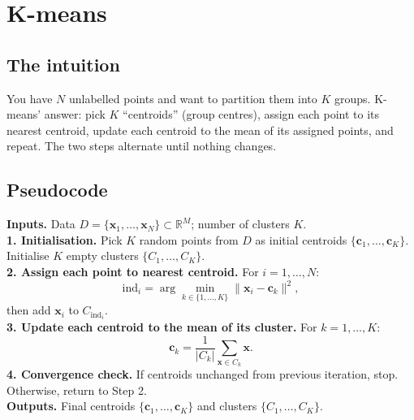 \documentclass[11pt, a4paper]{article}
\begin{document}
\section{K-means}

\subsection{The intuition}

You have $N$ unlabelled points and want to partition them into $K$ groups. K-means' answer: pick $K$ ``centroids'' (group centres), assign each point to its nearest centroid, update each centroid to the mean of its assigned points, and repeat. The two steps alternate until nothing changes.

\subsection{Pseudocode}

\begin{exbox}
\textbf{Inputs.} Data $D = \{\mathbf{x}_1, \ldots, \mathbf{x}_N\} \subset \mathbb{R}^M$; number of clusters $K$.\\[0.3em]
\textbf{1. Initialisation.} Pick $K$ random points from $D$ as initial centroids $\{\mathbf{c}_1, \ldots, \mathbf{c}_K\}$. Initialise $K$ empty clusters $\{C_1, \ldots, C_K\}$.\\[0.2em]
\textbf{2. Assign each point to nearest centroid.} For $i = 1, \ldots, N$:
\[
\mathrm{ind}_i = \arg\min_{k\in\{1,\ldots,K\}}\|\mathbf{x}_i - \mathbf{c}_k\|^2,
\]
\quad then add $\mathbf{x}_i$ to $C_{\mathrm{ind}_i}$.\\[0.2em]
\textbf{3. Update each centroid to the mean of its cluster.} For $k = 1, \ldots, K$:
\[
\mathbf{c}_k = \frac{1}{|C_k|} \sum_{\mathbf{x}\in C_k} \mathbf{x}.
\]
\textbf{4. Convergence check.} If centroids unchanged from previous iteration, stop. Otherwise, return to Step 2.\\[0.2em]
\textbf{Outputs.} Final centroids $\{\mathbf{c}_1, \ldots, \mathbf{c}_K\}$ and clusters $\{C_1, \ldots, C_K\}$.
\end{exbox}
\end{document}
